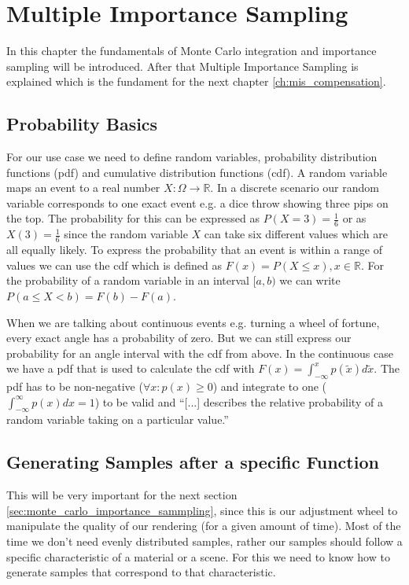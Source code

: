 \chapter{Multiple Importance Sampling}
\label{ch:mis}

In this chapter the fundamentals of Monte Carlo integration and importance sampling will be introduced.
After that Multiple Importance Sampling is explained which is the fundament for the next chapter \ref{ch:mis_compensation}.


\section{Probability Basics}
\label{sec:probability_basics}

For our use case we need to define random variables, probability distribution functions (pdf) and cumulative distribution functions (cdf).
A random variable maps an event to a real number $ X: \Omega \to \mathbb{R} $.
In a discrete scenario our random variable corresponds to one exact event e.g. a dice throw showing three pips on the top.
The probability for this can be expressed as $ P(X = 3) = \frac{1}{6} $ or as $ X(3) = \frac{1}{6} $
since the random variable $ X $ can take six different values which are all equally likely.
To express the probability that an event is within a range of values we can use the cdf
which is defined as $ F(x) = P(X \leq x), x \in \mathbb{R} $.
For the probability of a random variable in an interval $ [a, b) $ we can write $ P(a \leq X < b) = F(b) - F(a) $.\cite{pris}

When we are talking about continuous events e.g. turning a wheel of fortune, every exact angle has a probability of zero.
But we can still express our probability for an angle interval with the cdf from above.
In the continuous case we have a pdf that is used to calculate the cdf with $ F(x) = \int_{-\infty}^x p(\tilde{x}) d\tilde{x} $.
The pdf has to be non-negative ($ \forall x: p(x) \geq 0 $) and integrate to one ($ \int_{-\infty}^{\infty} p(x) dx = 1$) to be valid and
\enquote{[...] describes the relative probability of a random variable taking on a particular value.}\cite{pbr-book}


\section{Generating Samples after a specific Function}
\label{sec:sample_generation}
This will be very important for the next section \ref{sec:monte_carlo_importance_sammpling},
since this is our adjustment wheel to manipulate the quality of our rendering (for a given amount of time).
Most of the time we don't need evenly distributed samples,
rather our samples should follow a specific characteristic of a material or a scene.
For this we need to know how to generate samples that correspond to that characteristic.

